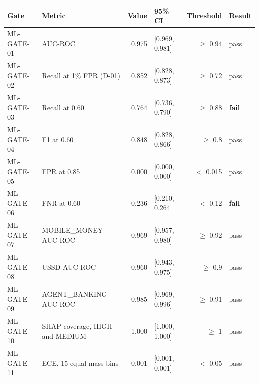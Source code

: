 \begin{tabular}{llrlrl}
\toprule
Gate & Metric & Value & 95\% CI & Threshold & Result \\
\midrule
ML-GATE-01 & AUC-ROC & 0.975 & [0.969, 0.981] & $\geq$ 0.94 & pass \\
ML-GATE-02 & Recall at 1\% FPR (D-01) & 0.852 & [0.828, 0.873] & $\geq$ 0.72 & pass \\
ML-GATE-03 & Recall at 0.60 & 0.764 & [0.736, 0.790] & $\geq$ 0.88 & \textbf{fail} \\
ML-GATE-04 & F1 at 0.60 & 0.848 & [0.828, 0.866] & $\geq$ 0.8 & pass \\
ML-GATE-05 & FPR at 0.85 & 0.000 & [0.000, 0.000] & $<$ 0.015 & pass \\
ML-GATE-06 & FNR at 0.60 & 0.236 & [0.210, 0.264] & $<$ 0.12 & \textbf{fail} \\
ML-GATE-07 & MOBILE_MONEY AUC-ROC & 0.969 & [0.957, 0.980] & $\geq$ 0.92 & pass \\
ML-GATE-08 & USSD AUC-ROC & 0.960 & [0.943, 0.975] & $\geq$ 0.9 & pass \\
ML-GATE-09 & AGENT_BANKING AUC-ROC & 0.985 & [0.969, 0.996] & $\geq$ 0.91 & pass \\
ML-GATE-10 & SHAP coverage, HIGH and MEDIUM & 1.000 & [1.000, 1.000] & $\geq$ 1 & pass \\
ML-GATE-11 & ECE, 15 equal-mass bins & 0.001 & [0.001, 0.001] & $<$ 0.05 & pass \\
\bottomrule
\end{tabular}
